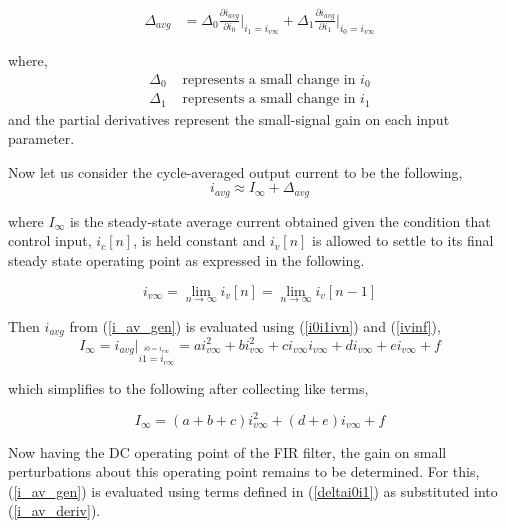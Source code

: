 \documentclass[conference]{IEEEtran}
\begin{document}
\begin{align}
\Delta{_{avg}} &= \Delta{_0}\frac{\partial i_{avg}}{\partial i_0}\bigg|_{i_1=i_{v\infty}} + \Delta{_1}\frac{\partial i_{avg}}{\partial i_1}\bigg|_{i_0=i_{v\infty}} 
  \label{i_av_deriv}
\end{align}

where,
\begin{align}
	\Delta_0 & \text{ represents a small change in } i_0 \nonumber \\
	\Delta_1 & \text{ represents a small change in } i_1 
	\label{deltai0i1}
\end{align}
and the partial derivatives represent the small-signal gain on each input parameter.

Now let us consider the cycle-averaged output current to be the following,
\begin{equation}	
	i_{avg} \approx I_{\infty} + \Delta_{avg}
\end{equation}

where $I_{\infty}$ is the steady-state average current obtained given the condition that control input, $i_c[n]$, is held constant and $i_v[n]$ is allowed to settle to its final steady state operating point as expressed in the following.

\begin{equation}
	i_{v\infty} = \lim_{n \to \infty} i_{v}[n] = \lim_{n \to \infty}  i_{v}[n-1]
	\label{ivinf}
\end{equation}

Then $i_{avg}$ from (\ref{i_av_gen}) is evaluated using (\ref{i0i1ivn}) and (\ref{ivinf}),
\begin{equation}
	I_{\infty} = i_{avg} \bigg|_{\stackrel{i0=i_{v \infty}}{i1=i_{v \infty}}} = a i_{v \infty}^2+b i_{v \infty}^2+c i_{v \infty}i_{v \infty}+d i_{v \infty}+e i_{v \infty}+f 
\end{equation}

which simplifies to the following after collecting like terms,

\begin{equation}
I_{\infty} = (a + b +c)i_{v \infty}^2 + (d+e)i_{v \infty} + f
\label{iavg_steady_state}
\end{equation}

Now having the DC operating point of the FIR filter, the gain on small perturbations about this operating point remains to be determined.  For this,  (\ref{i_av_gen}) is evaluated using terms defined in (\ref{deltai0i1}) as substituted into (\ref{i_av_deriv}).
\end{document}
